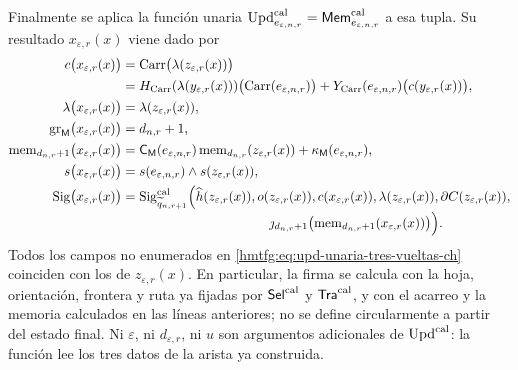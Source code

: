 Finalmente se aplica la función unaria
\(\operatorname{Upd}^{\rm cal}_{e_{\varepsilon,n,r}}
=\mathsf{Mem}^{\rm cal}_{e_{\varepsilon,n,r}}\) a esa tupla. Su
resultado \(x_{\varepsilon,r}(x)\) viene dado por
\begin{equation}
\begin{aligned}
 c\bigl(x_{\varepsilon,r}(x)\bigr)
   &=\operatorname{Carr}\bigl(\lambda(z_{\varepsilon,r}(x))\bigr)\\
   &=H_{\rm Carr}(\lambda(y_{\varepsilon,r}(x)))
       \bigl(\operatorname{Carr}(e_{\varepsilon,n,r})\bigr)
     +Y_{\rm Carr}(e_{\varepsilon,n,r})
       \bigl(c(y_{\varepsilon,r}(x))\bigr),\\
 \lambda\bigl(x_{\varepsilon,r}(x)\bigr)
   &=\lambda(z_{\varepsilon,r}(x)),\\
 \operatorname{gr}_{\mathsf M}
      \bigl(x_{\varepsilon,r}(x)\bigr)
   &=d_{n,r}+1,\\
 \operatorname{mem}_{d_{n,r}+1}
       \bigl(x_{\varepsilon,r}(x)\bigr)
   &=\mathsf C_{\mathsf M}(e_{\varepsilon,n,r})
       \operatorname{mem}_{d_{n,r}}(z_{\varepsilon,r}(x))
     +\kappa_{\mathsf M}(e_{\varepsilon,n,r}),\\
 s\bigl(x_{\varepsilon,r}(x)\bigr)
   &=s(e_{\varepsilon,n,r})\wedge s(z_{\varepsilon,r}(x)),\\
 \operatorname{Sig}\bigl(x_{\varepsilon,r}(x)\bigr)
   &=\operatorname{Sig}^{\rm cal}_{\widetilde q_{n,r+1}}
       \Bigl(\widehat h(z_{\varepsilon,r}(x)),
             o(z_{\varepsilon,r}(x)),
             c(x_{\varepsilon,r}(x)),
             \lambda(z_{\varepsilon,r}(x)),
             \partial C(z_{\varepsilon,r}(x)),\\[-2pt]
   &\hspace{112pt}
             \jmath_{d_{n,r}+1}
              \bigl(\operatorname{mem}_{d_{n,r}+1}
                 (x_{\varepsilon,r}(x))\bigr)\Bigr).
\end{aligned}
\label{hmtfg:eq:upd-unaria-tres-vueltas-ch}
\end{equation}
Todos los campos no enumerados en
\eqref{hmtfg:eq:upd-unaria-tres-vueltas-ch} coinciden con los de
\(z_{\varepsilon,r}(x)\). En particular, la firma se calcula con la hoja,
orientación, frontera y ruta ya fijadas por \(\mathsf{Sel}^{\rm cal}\) y
\(\mathsf{Tra}^{\rm cal}\), y con el acarreo y la memoria calculados en las
líneas anteriores; no se define circularmente a partir del estado final.
Ni \(\varepsilon\), ni \(d_{\varepsilon,r}\), ni \(u\) son argumentos
adicionales de \(\operatorname{Upd}^{\rm cal}\): la función lee los tres datos de la
arista ya construida.

